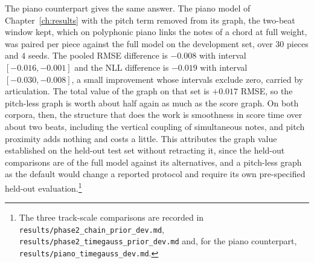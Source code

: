 The piano counterpart gives the same answer. The piano model of
Chapter~\ref{ch:results} with the pitch term removed from its graph, the
two-beat window kept, which on polyphonic piano links the notes of a chord
at full weight, was paired per piece against the full model on the
development set, over $30$ pieces and $4$ seeds. The pooled RMSE difference
is $-0.008$ with interval $[-0.016, -0.001]$ and the NLL difference is
$-0.019$ with interval $[-0.030, -0.008]$, a small improvement whose
intervals exclude zero, carried by articulation. The total value of the
graph on that set is $+0.017$ RMSE, so the pitch-less graph is worth about
half again as much as the score graph. On both corpora, then, the structure
that does the work is smoothness in score time over about two beats,
including the vertical coupling of simultaneous notes, and pitch proximity
adds nothing and costs a little. This attributes the graph value
established on the held-out test set without retracting it, since the
held-out comparisons are of the full model against its alternatives, and a
pitch-less graph as the default would change a reported protocol and
require its own pre-specified held-out evaluation.\footnote{The three
track-scale comparisons are recorded in
\texttt{results/phase2\_chain\_prior\_dev.md},
\texttt{results/phase2\_timegauss\_prior\_dev.md} and, for the piano
counterpart, \texttt{results/piano\_timegauss\_dev.md}.}
